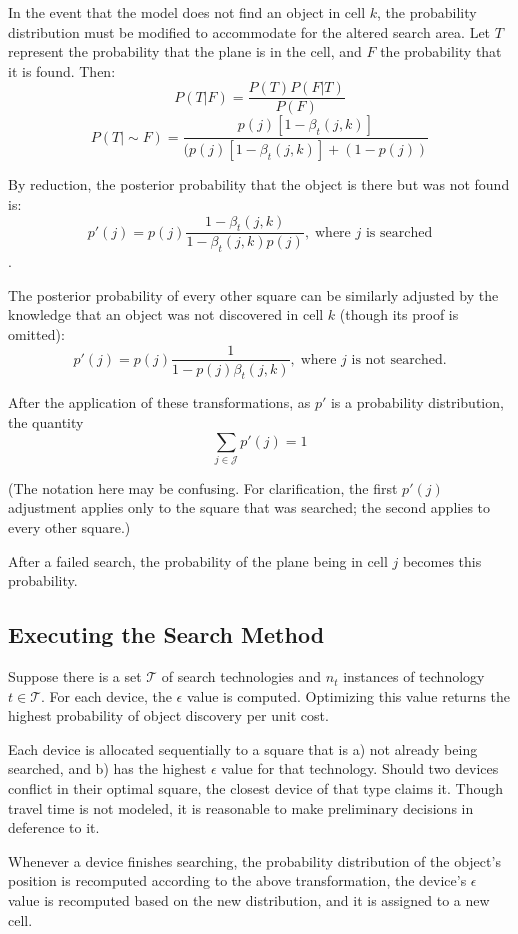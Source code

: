\documentclass[a4paper]{article}
\begin{document}
In the event that the model does not find an object in cell $k$, the probability distribution must be modified to accommodate for the altered search area. Let $T$ represent the probability that the plane is in the cell, and $F$ the probability that it is found. Then: 
$$P(T|F)=\frac{P(T)P(F|T)}{P(F)}$$ 
$$P(T|\sim F)=\frac{p(j)[1-\beta_t(j,k)]}{(p(j)[1-\beta_t(j,k)]+(1-p(j))}$$

By reduction, the posterior probability that the object is there but was not found is: $$p'(j)=p(j)\frac{1-\beta_t(j,k)}{1-\beta_t(j,k)p(j)},\;\mbox{where }j\mbox{ is searched}$$.

The posterior probability of every other square can be similarly adjusted by the knowledge that an object was not discovered in cell $k$ (though its proof is omitted): $$p'(j)=p(j)\frac{1}{1-p(j)\beta_t(j,k)},\;\mbox{where }j\mbox{ is not searched.}$$

After the application of these transformations, as $p'$ is a probability distribution, the quantity $$\sum_{j\in\mathcal{J}}p'(j) = 1$$

(The notation here may be confusing. For clarification, the first $p'(j)$ adjustment applies only to the square that was searched; the second applies to every other square.)

After a failed search, the probability of the plane being in cell $j$ becomes this probability.

\subsection{Executing the Search Method}

Suppose there is a set $\mathcal{T}$ of search technologies and $n_t$ instances of technology $t\in\mathcal{T}$. For each device, the $\epsilon$ value is computed. Optimizing this value returns the highest probability of object discovery per unit cost.

Each device is allocated sequentially to a square that is a) not already being searched, and b) has the highest $\epsilon$ value for that technology. Should two devices conflict in their optimal square, the closest device of that type claims it. Though travel time is not modeled, it is reasonable to make preliminary decisions in deference to it.

Whenever a device finishes searching, the probability distribution of the object's position is recomputed according to the above transformation, the device's $\epsilon$ value is recomputed based on the new distribution, and it is assigned to a new cell.
\end{document}
